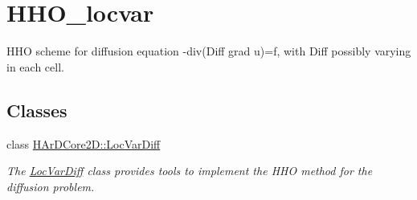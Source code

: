 \hypertarget{group__HHO__locvar}{}\section{H\+H\+O\+\_\+locvar}
\label{group__HHO__locvar}


H\+HO scheme for diffusion equation -\/div(Diff grad u)=f, with Diff possibly varying in each cell.  


\subsection*{Classes}
\begin{DoxyCompactItemize}
\item 
class \hyperlink{classHArDCore2D_1_1LocVarDiff}{H\+Ar\+D\+Core2\+D\+::\+Loc\+Var\+Diff}
\begin{DoxyCompactList}\small\item\em The \hyperlink{classHArDCore2D_1_1LocVarDiff}{Loc\+Var\+Diff} class provides tools to implement the H\+HO method for the diffusion problem. \end{DoxyCompactList}\end{DoxyCompactItemize}

